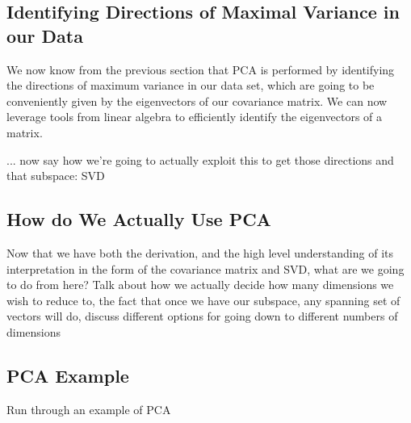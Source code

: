 \subsection{Identifying Directions of Maximal Variance in our Data}
We now know from the previous section that PCA is performed by identifying the directions of maximum variance in our data set, which are going to be conveniently given by the eigenvectors of our covariance matrix. We can now leverage tools from linear algebra to efficiently identify the eigenvectors of a matrix.

... now say how we're going to actually exploit this to get those directions and that subspace: SVD

\subsection{How do We Actually Use PCA}
Now that we have both the derivation, and the high level understanding of its interpretation in the form of the covariance matrix and SVD, what are we going to do from here? Talk about how we actually decide how many dimensions we wish to reduce to, the fact that once we have our subspace, any spanning set of vectors will do, discuss different options for going down to different numbers of dimensions

\subsection{PCA Example}
Run through an example of PCA
